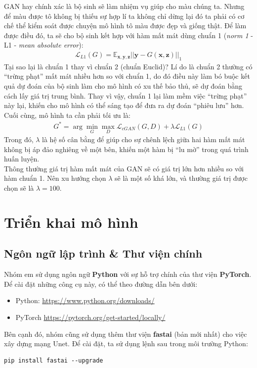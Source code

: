 \documentclass[a4paper]{article}
\begin{document}
\noindent
GAN hay chính xác là bộ sinh sẽ làm nhiệm vụ giúp cho màu chúng ta. Nhưng để màu được tô không bị thiếu sự hợp lí ta không chỉ dừng lại đó ta phải có cơ chế thể kiểm soát được chuyện mô hình tô màu được đẹp và giống thật. Để làm được điều đó, ta sẽ cho bộ sinh kết hợp với hàm mất mát dùng chuẩn 1 (\textit{norm 1} - L1 - \textit{mean absolute error}):
\begin{align*}
    \mathcal{L}_{L1}(G) = \mathbb{E}_{\mathbf{x}, \mathbf{y}, \mathbf{z}}\left|\left|\mathbf{y} - G(\mathbf{x}, \mathbf{z})\right|\right|_1
\end{align*}
Tại sao lại là chuẩn 1 thay vì chuẩn 2 (chuẩn Euclid)? Lí do là chuẩn 2 thường có ``trừng phạt'' mất mát nhiều hơn so với chuẩn 1, do đó điều này làm bó buộc kết quả dự đoán của bộ sinh làm cho mô hình có xu thế bảo thủ, sẽ dự đoán bằng cách lấy giá trị trung bình. Thay vì vậy, chuẩn 1 lại làm mềm việc ``trừng phạt'' này lại, khiến cho mô hình có thể sáng tạo để đưa ra dự đoán ``phiêu lưu'' hơn. \\
Cuối cùng, mô hình ta cần phải tối ưu là:
\begin{align*}
    G^* = \arg\underset{G}{\min}\underset{D}{\max}\mathcal{L}_{cGAN}(G, D) + \lambda \mathcal{L}_{L1}(G)
\end{align*}
Trong đó, $\lambda$ là hệ số cân bằng để giúp cho sự chênh lệch giữa hai hàm mất mát không bị áp đảo nghiêng về một bên, khiến một hàm bị ``lu mờ'' trong quá trình huấn luyện.\\
Thông thường giá trị hàm mất mát của GAN sẽ có giá trị lớn hơn nhiều so với hàm chuẩn 1. Nên xu hướng chọn $\lambda$ sẽ là một số khá lớn, và thường giá trị được chọn sẽ là $\lambda = 100$.

\section{Triển khai mô hình}

\subsection{Ngôn ngữ lập trình \& Thư viện chính}
Nhóm em sử dụng ngôn ngữ \textbf{Python} với sự hỗ trợ chính của thư viện \textbf{PyTorch}. Để cài đặt những công cụ này, có thể theo đường dẫn bên dưới:
\begin{itemize}
    \item Python: \href{https://www.python.org/downloads/}{https://www.python.org/downloads/}
    \item PyTorch \href{https://pytorch.org/get-started/locally/}{https://pytorch.org/get-started/locally/}
\end{itemize}
Bên cạnh đó, nhóm cũng sử dụng thêm thư viện \textbf{fastai} (bản mới nhất) cho việc xây dựng mạng Unet. Để cài đặt, ta sử dụng lệnh sau trong môi trường Python:
\begin{lstlisting}
pip install fastai --upgrade
\end{lstlisting}
\end{document}
